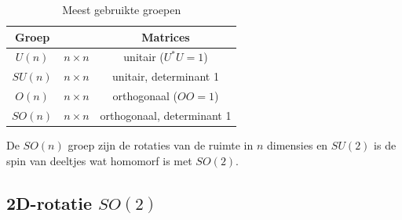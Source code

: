 \documentclass[../main.tex]{subfiles}
\begin{document}
\begin{table}[h]
    \centering
    \caption{Meest gebruikte groepen}
    \label{tab:deeltjes_groepen}
    \begin{tabular}{ccc}
        Groep &  & Matrices \\
        \hline
        $U(n)$ & $n\times n$ & unitair ($U^*U=1$) \\
        $SU(n)$ & $n\times n$ & unitair, determinant 1 \\
        $O(n)$ & $n\times n$ & orthogonaal ($OO=1$) \\
        $SO(n)$ & $n\times n$ & orthogonaal, determinant 1 \\
    \end{tabular}
\end{table}
De $SO(n)$ groep zijn de rotaties van de ruimte in $n$ dimensies en $SU(2)$ is de spin van deeltjes wat homomorf is met $SO(2)$.

\subsection{2D-rotatie $SO(2)$}%
\label{sub:2d_rotatie_so_2}
\end{document}
